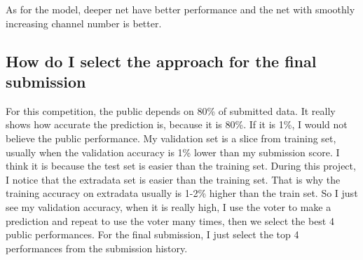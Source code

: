 \documentclass[twocolumn]{webofc}
\begin{document}
As for the model, deeper net have better performance and the net with smoothly increasing channel number is better. 




\subsection{How do I select the approach for the final submission
}\label{sec:formatting}

For this competition, the public depends on 80\% of submitted data. It really shows how accurate the prediction is, because it is 80\%. If it is 1\%, I would not believe the public performance. My validation set is a slice from training set, usually when the validation accuracy is 1\% lower than my submission score. I think it is because the test set is easier than the training set. During this project, I notice that the extradata set is easier than the training set. That is why the training accuracy on extradata usually is 1-2\% higher than the train set. So I just see my validation accuracy, when it is really high, I use the voter to make a prediction and repeat to use the voter many times, then we select the best 4 public performances. 
For the final submission, I just select the top 4 performances from the submission history.
\end{document}
